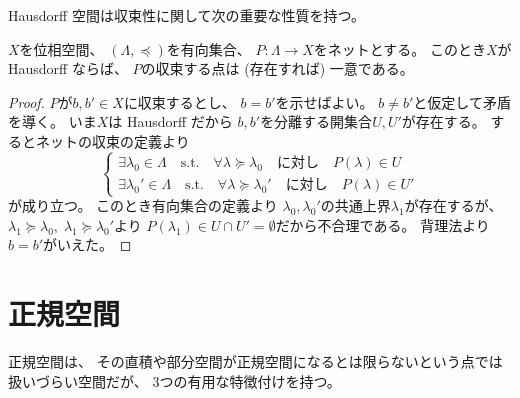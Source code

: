 \documentclass[report]{jlreq}
\begin{document}
Hausdorff 空間は収束性に関して次の重要な性質を持つ。

\begin{proposition}[極限の一意性]
    $X$を位相空間、
    $(\Lambda, \preceq)$を有向集合、
    $P \colon \Lambda \to X$をネットとする。
    このとき$X$が Hausdorff ならば、
    $P$の収束する点は (存在すれば) 一意である。
\end{proposition}

\begin{proof}
    $P$が$b, b' \in X$に収束するとし、
    $b = b'$を示せばよい。
    $b \neq b'$と仮定して矛盾を導く。
    いま$X$は Hausdorff だから
    $b, b'$を分離する開集合$U, U'$が存在する。
    するとネットの収束の定義より
    \begin{equation}
        \begin{cases}
            \exists \lambda_0 \in \Lambda
                \quad \text{s.t.} \quad
                \forall \lambda \succeq \lambda_0
                \quad \text{に対し} \quad
                P(\lambda) \in U \\
            \exists \lambda_0' \in \Lambda
                \quad \text{s.t.} \quad
                \forall \lambda \succeq \lambda_0'
                \quad \text{に対し} \quad
                P(\lambda) \in U'
        \end{cases}
    \end{equation}
    が成り立つ。
    このとき有向集合の定義より
    $\lambda_0, \lambda_0'$の共通上界$\lambda_1$が存在するが、
    $\lambda_1 \succeq \lambda_0, \; \lambda_1 \succeq \lambda_0'$より
    $P(\lambda_1) \in U \cap U' = \emptyset$だから不合理である。
    背理法より$b = b'$がいえた。
\end{proof}

%
\section{正規空間}

正規空間は、
その直積や部分空間が正規空間になるとは限らないという点では扱いづらい空間だが、
3つの有用な特徴付けを持つ。

\begin{definition}[正規空間]
    \TODO{}
\end{definition}

\begin{theorem}
    \TODO{}
\end{theorem}
\end{document}
